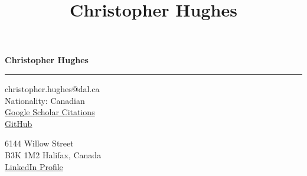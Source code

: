\documentclass[11pt]{article}
\title{\bfseries\Huge Christopher Hughes}
\author{}
\date{}
\begin{document}
	\newpage
	\setcounter{page}{2}
	\noindent

\begin{LARGE}

	\noindent\textbf{Christopher Hughes}\vspace{1pt}

\end{LARGE}


\noindent\rule{\textwidth}{1pt}\vspace{9pt}

\noindent
\begin{minipage}{0.5\textwidth}
	\begin{flushleft}
		christopher.hughes@dal.ca\\
		Nationality: Canadian\\ 
		\href{https://scholar.google.com/citations?user=jPSwBGwAAAAJ}{Google Scholar Citations}\\
		\href{https://github.com/chrishuges}{GitHub}
	\end{flushleft}
\end{minipage}%
\begin{minipage}{0.5\textwidth}
	\begin{flushright}
		6144 Willow Street\\
		B3K 1M2 Halifax, Canada\\ 
		\href{https://www.linkedin.com/in/christopher-hughes-612460133/}{LinkedIn Profile}
	\end{flushright}
\end{minipage}\vspace{6pt}
\end{document}
